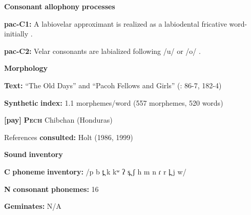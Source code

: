 \documentclass[output=paper]{langsci/langscibook}
\begin{document}
\begin{styleBody}
\textbf{Consonant} \textbf{allophony} \textbf{processes}
\end{styleBody}

\begin{styleBody}
\textbf{pac-C1:} A labiovelar approximant is realized as a labiodental fricative word-initially \citep[11]{Alves2006}.
\end{styleBody}

\begin{styleBody}
\textbf{pac-C2:} Velar consonants are labialized following /u/ or /o/ \citep[12]{Alves2006}.
\end{styleBody}

\begin{styleBody}
\textbf{Morphology}
\end{styleBody}

\begin{styleBody}
\textbf{Text:} “The Old Days” and “Pacoh Fellows and Girls” (\citealt{Watson1980}: 86-7, 182-4)
\end{styleBody}

\begin{styleBody}
\textbf{Synthetic} \textbf{index:} 1.1 morphemes/word (557 morphemes, 520 words)
\end{styleBody}

\begin{styleBody}
\textbf{[pay]}   \textbf{\textsc{Pech}}  Chibchan (Honduras)
\end{styleBody}

\begin{styleBody}
References \textbf{consulted:} Holt (1986, 1999)
\end{styleBody}

\begin{styleBody}
\textbf{Sound} \textbf{inventory}
\end{styleBody}

\begin{styleBody}
\textbf{C} \textbf{phoneme} \textbf{inventory:} /p b t̪ k kʷ ʔ s̪ ʃ h m n ɾ r l̪ j w/
\end{styleBody}

\begin{styleBody}
\textbf{N} \textbf{consonant} \textbf{phonemes:} 16
\end{styleBody}

\begin{styleBody}
\textbf{Geminates:} N/A
\end{styleBody}
\end{document}
